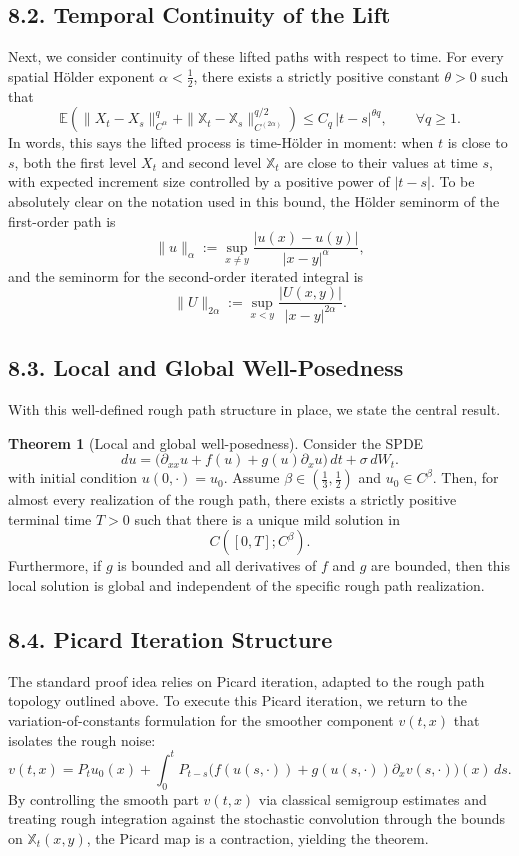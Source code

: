 \documentclass[11pt]{article}
\theoremstyle{definition}
\newtheorem{theorem}{Theorem}
\theoremstyle{remark}
\begin{document}
\subsection*{8.2. Temporal Continuity of the Lift}
Next, we consider continuity of these lifted paths with respect to time. For every spatial H\"older exponent $\alpha<\frac12$, there exists a strictly positive constant $\theta>0$ such that
\[
\mathbb E\!\left(
\|X_t-X_s\|_{C^{\alpha}}^{q}
+
\|\mathbb X_t-\mathbb X_s\|_{C^{(2\alpha)}}^{q/2}
\right)
\le C_q\,|t-s|^{\theta q},
\qquad \forall q\ge1.
\]
In words, this says the lifted process is time-H\"older in moment: when $t$ is close to $s$, both the first level $X_t$ and second level $\mathbb X_t$ are close to their values at time $s$, with expected increment size controlled by a positive power of $|t-s|$.
To be absolutely clear on the notation used in this bound, the H\"older seminorm of the first-order path is
\[
\|u\|_{\alpha}
:=
\sup_{x\ne y}\frac{|u(x)-u(y)|}{|x-y|^{\alpha}},
\]
and the seminorm for the second-order iterated integral is
\[
\|U\|_{2\alpha}
:=
\sup_{x<y}\frac{|U(x,y)|}{|x-y|^{2\alpha}}.
\]

\subsection*{8.3. Local and Global Well-Posedness}
With this well-defined rough path structure in place, we state the central result.
\begin{theorem}[Local and global well-posedness]
Consider the SPDE
\[
du=\bigl(\partial_{xx}u+f(u)+g(u)\partial_xu\bigr)\,dt+\sigma\,dW_t.
\]
with initial condition $u(0,\cdot)=u_0$.
Assume $\beta\in(\frac13,\frac12)$ and $u_0\in C^{\beta}$. Then, for almost every realization of the rough path, there exists a strictly positive terminal time $T>0$ such that there is a unique mild solution in
\[
C([0,T];C^{\beta}).
\]
Furthermore, if $g$ is bounded and all derivatives of $f$ and $g$ are bounded, then this local solution is global and independent of the specific rough path realization.
\end{theorem}

\subsection*{8.4. Picard Iteration Structure}
The standard proof idea relies on Picard iteration, adapted to the rough path topology outlined above. To execute this Picard iteration, we return to the variation-of-constants formulation for the smoother component $v(t,x)$ that isolates the rough noise:
\[
v(t,x)
=
P_tu_0(x)
+
\int_0^t P_{t-s}\bigl(f(u(s,\cdot))+g(u(s,\cdot))\partial_xv(s,\cdot)\bigr)(x)\,ds.
\]
By controlling the smooth part $v(t,x)$ via classical semigroup estimates and treating rough integration against the stochastic convolution through the bounds on $\mathbb X_t(x,y)$, the Picard map is a contraction, yielding the theorem.
\end{document}
